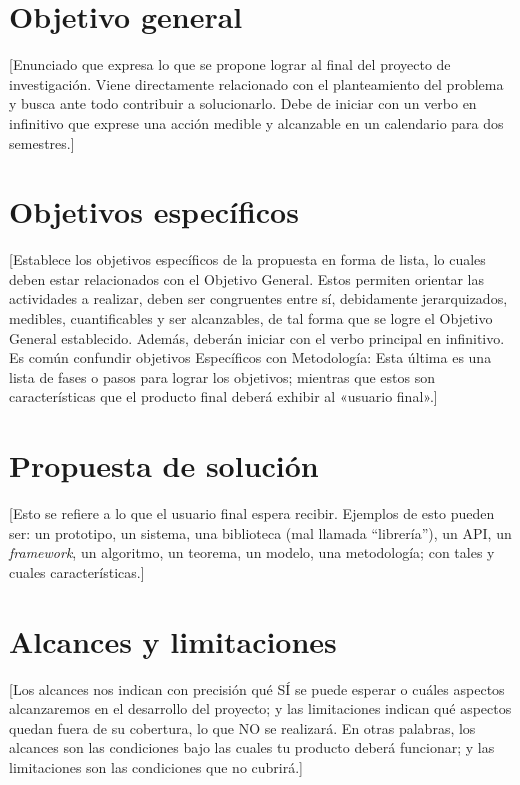 \documentclass[final,12pt]{article}
\begin{document}
\section{Objetivo general}

[Enunciado que expresa lo que se propone lograr al final del proyecto de investigación. 
Viene directamente relacionado con el planteamiento del problema y busca ante todo contribuir a solucionarlo. 
Debe de iniciar con un verbo en infinitivo que exprese una acción medible y alcanzable en un calendario para dos semestres.]


\section{Objetivos específicos}
[Establece los objetivos específicos de la propuesta en forma de lista, lo cuales deben estar relacionados con el Objetivo General. Estos permiten orientar las actividades a realizar, deben ser congruentes entre sí, debidamente jerarquizados, medibles, cuantificables y ser alcanzables, de tal forma que se logre el Objetivo General establecido. Además, deberán iniciar con el verbo principal en infinitivo.
Es común confundir objetivos Específicos con Metodología: Esta última es una lista de fases o pasos para lograr los objetivos; mientras que estos son características que el producto final deberá exhibir al «usuario final».]

\section{Propuesta de solución}

[Esto se refiere a lo que el usuario final espera recibir.
Ejemplos de esto pueden ser: un prototipo, un sistema, una biblioteca  (mal llamada ``librería''), un API, un \textit{framework}, un algoritmo, un teorema, un modelo, una metodología; con tales y cuales características.]




\section{Alcances y limitaciones}

[Los alcances nos indican con precisión qué SÍ se puede esperar o cuáles aspectos alcanzaremos en el desarrollo del proyecto; y las limitaciones indican qué aspectos quedan fuera de su cobertura, lo que NO se realizará. 
En otras palabras, los alcances son las condiciones bajo las cuales tu producto deberá funcionar; y las limitaciones son las condiciones que no cubrirá.]
\end{document}
